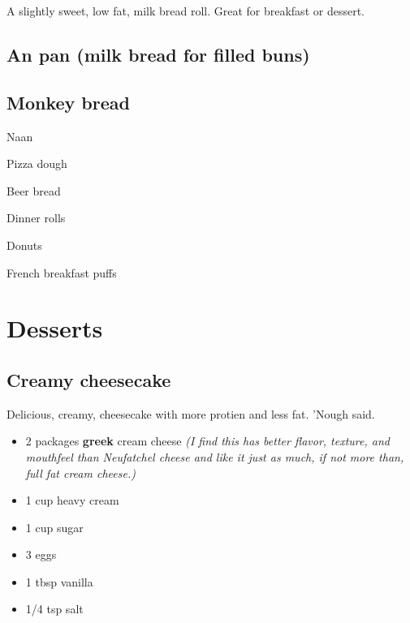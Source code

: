 \documentclass[
]{book}
\providecommand{\tightlist}{%
  \setlength{\itemsep}{0pt}\setlength{\parskip}{0pt}}
\begin{document}
A slightly sweet, low fat, milk bread roll. Great for breakfast or dessert.

\hypertarget{anpan}{%
\subsection*{An pan (milk bread for filled buns)}\label{anpan}}

\hypertarget{monkey}{%
\subsection*{Monkey bread}\label{monkey}}

Naan

Pizza dough

Beer bread

Dinner rolls

Donuts

French breakfast puffs

\hypertarget{desserts}{%
\section*{Desserts}\label{desserts}}

\hypertarget{cheesecake}{%
\subsection*{Creamy cheesecake}\label{cheesecake}}

Delicious, creamy, cheesecake with more protien and less fat. 'Nough said.

\begin{blackbox}

\begin{itemize}
\tightlist
\item
  2 packages \textbf{greek} cream cheese \emph{(I find this has better flavor, texture, and mouthfeel than Neufatchel cheese and like it just as much, if not more than, full fat cream cheese.)}
\item
  1 cup heavy cream
\item
  1 cup sugar
\item
  3 eggs
\item
  1 tbsp vanilla
\item
  1/4 tsp salt
\end{itemize}

\end{blackbox}
\end{document}
